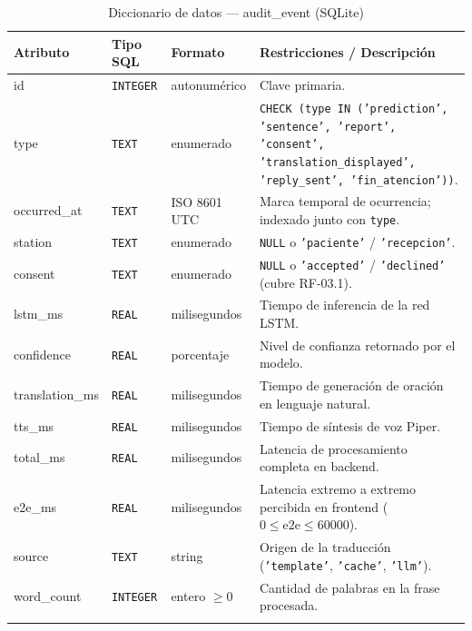 \begin{longtable}{p{3.2cm} p{2.2cm} p{3.2cm} p{5.2cm}}
    \toprule
    \textbf{Atributo} & \textbf{Tipo SQL} & \textbf{Formato} & \textbf{Restricciones / Descripción} \\
    \midrule
    \endhead
    id & \texttt{INTEGER} & autonumérico & Clave primaria. \\
    type & \texttt{TEXT} & enumerado & \texttt{CHECK (type IN ('prediction', 'sentence', 'report', 'consent', 'translation\_displayed', 'reply\_sent', 'fin\_atencion'))}. \\
    occurred\_at & \texttt{TEXT} & ISO 8601 UTC & Marca temporal de ocurrencia; indexado junto con \texttt{type}. \\
    station & \texttt{TEXT} & enumerado & \texttt{NULL} o \texttt{'paciente'} / \texttt{'recepcion'}. \\
    consent & \texttt{TEXT} & enumerado & \texttt{NULL} o \texttt{'accepted'} / \texttt{'declined'} (cubre RF-03.1). \\
    lstm\_ms & \texttt{REAL} & milisegundos & Tiempo de inferencia de la red LSTM. \\
    confidence & \texttt{REAL} & porcentaje & Nivel de confianza retornado por el modelo. \\
    translation\_ms & \texttt{REAL} & milisegundos & Tiempo de generación de oración en lenguaje natural. \\
    tts\_ms & \texttt{REAL} & milisegundos & Tiempo de síntesis de voz Piper. \\
    total\_ms & \texttt{REAL} & milisegundos & Latencia de procesamiento completa en backend. \\
    e2e\_ms & \texttt{REAL} & milisegundos & Latencia extremo a extremo percibida en frontend ($0 \leq \mathrm{e2e} \leq 60000$). \\
    source & \texttt{TEXT} & string & Origen de la traducción (\texttt{'template'}, \texttt{'cache'}, \texttt{'llm'}). \\
    word\_count & \texttt{INTEGER} & entero $\geq 0$ & Cantidad de palabras en la frase procesada. \\
    \bottomrule
    \caption{Diccionario de datos — audit\_event (SQLite)}
    \label{tab:dat-dic-audit-event}
\end{longtable}

